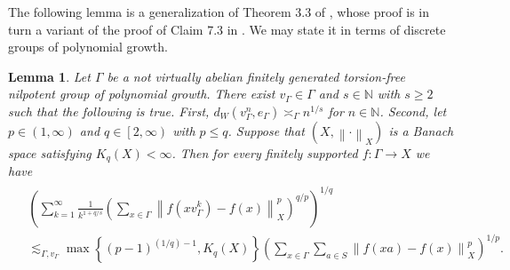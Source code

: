 \documentclass[11pt,reqno]{amsart}
\newtheorem{lemma}[theorem]{Lemma}
\newcommand{\1}{\mathbf 1}
\begin{document}
The following lemma is a generalization of Theorem 3.3 of \cite{lafforgue2014vertical}, whose proof is in turn a variant of the proof of Claim 7.3 in \cite{austin2013sharp}. We may state it in terms of discrete groups of polynomial growth.
\begin{lemma}\label{lem:pq-global}
Let $\Gamma$ be a not virtually abelian finitely generated torsion-free nilpotent group of polynomial growth. There exist $v_\Gamma\in \Gamma$ and $s\in \mathbb{N}$ with $s\ge 2$ such that the following is true. First, $d_W\left(v_\Gamma^n,e_\Gamma\right)\asymp_\Gamma n^{1/s}$ for $n\in \mathbb{N}$. Second, let $p\in \left(1,\infty\right)$ and $q\in \left[2,\infty\right)$ with $p\le q$. Suppose that $\left(X,\left\|\cdot\right\|_X\right)$ is a Banach space satisfying $K_q\left(X\right)<\infty$.  Then for every finitely supported $f:\Gamma\to X$ we have
\begin{align*}
\begin{aligned}
&\left(\sum_{k=1}^{\infty}\frac{1}{k^{1+q/s}}\left(\sum_{x\in \Gamma} \left\|f\left(xv_\Gamma^k\right)-f\left(x\right)\right\|_X^p\right)^{q/p}\right)^{1/q}\\
&\lesssim_{\Gamma,v_\Gamma} \max\left\{\left(p-1\right)^{(1/q)-1},K_q\left(X\right)\right\} 
\left(\sum_{x\in \Gamma} \sum_{a\in S}\left\|f\left(xa\right)-f\left(x\right)\right\|^p_X\right)^{1/p}.
\end{aligned}
\end{align*}
\end{lemma}
\end{document}
